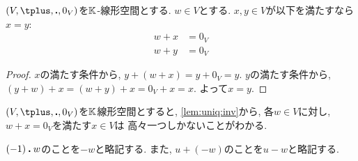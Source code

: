 \begin{lemma}
  \label{lem:uniq:inv}
  $(V,\plus ,\act ,0_V)$を$\mathbb{K}$-線形空間とする.
  $w\in V$とする.
  $x,y\in V$が以下を満たすなら$x=y$:
  \begin{align*}
    w\plus x&=0_V\\
    w\plus y&=0_V
  \end{align*}
\end{lemma}
\begin{proof}
  $x$の満たす条件から,
  $y\plus (w\plus x)=y\plus 0_V=y$.
  $y$の満たす条件から,
  $(y\plus w)\plus x=(w\plus y)\plus x=0_V\plus x=x$.
  よって$x=y$.
\end{proof}
\begin{remark}
\label{rem:altdef:2}
$(V,\plus,\act,0_V)$を$\mathbb{K}$線形空間とすると,
\cref{lem:uniq:inv}から,
各$w\in V$に対し, $w\plus x=0_V$を満たす$x\in V$は
高々一つしかないことがわかる.
\end{remark}
\begin{remark}
  $(-1)\mathbin{\boldsymbol{.}} w$のことを$-w$と略記する.
  また, $u\plus (-w)$のことを$u-w$と略記する.
\end{remark}

